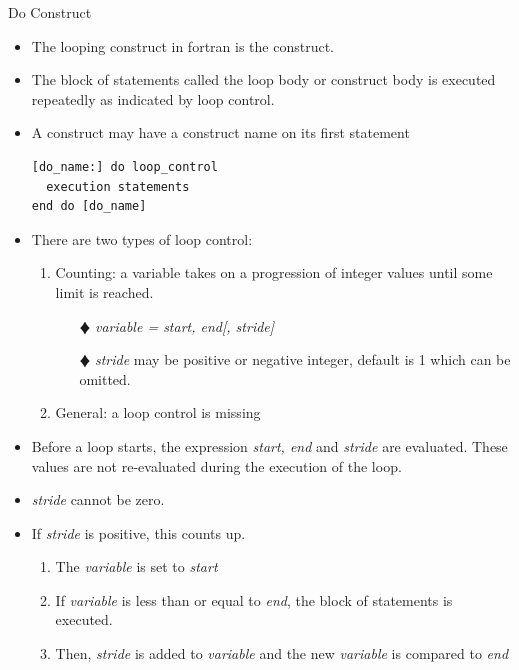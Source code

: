 \documentclass[10pt,t]{beamer}
\begin{document}
\begin{frame}{Do Construct}
  \begin{itemize}
    \item The looping construct in fortran is the  construct.
    \item The block of statements called the loop body or  construct body is executed repeatedly as indicated by loop control.
    \item A  construct may have a construct name on its first statement
      \begin{lstlisting}[language={[90]Fortran},basicstyle=\fontsize{6}{7}\selectfont\ttfamily]
[do_name:] do loop_control
  execution statements
end do [do_name]
      \end{lstlisting}
    \item There are two types of loop control:
    \begin{enumerate}
      \item Counting: a variable takes on a progression of integer values until some limit is reached.
      \begin{itemize}
        \item[$\vardiamond$] \textit{variable = start, end[, stride] }
        \item[$\vardiamond$] \textit{stride} may be positive or negative integer, default is 1 which can be omitted.
      \end{itemize}
      \item General: a loop control is missing
    \end{enumerate}
    \item Before a  loop starts, the expression \textit{start, end} and \textit{stride} are evaluated. These values are not re-evaluated during the execution of the  loop.
    \item \textit{stride} cannot be zero.
    \item If \textit{stride} is positive, this  counts up.
    \begin{enumerate}
      \scriptsize
      \item The \textit{variable} is set to \textit{start}
      \item If \textit{variable} is less than or equal to \textit{end}, the block of statements is executed.
      \item Then, \textit{stride} is added to \textit{variable} and the new \textit{variable} is compared to \textit{end}

\end{enumerate}
\end{itemize}
\end{frame}
\end{document}
